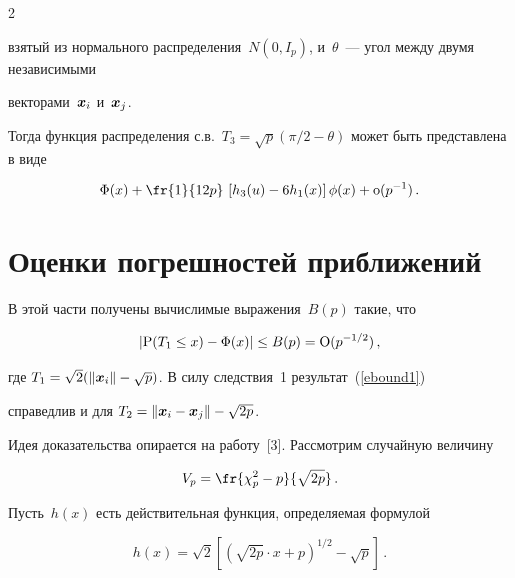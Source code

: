\begin{multicols}{2}
{взятый из нормального распределения~$N(0,I_p)$, и~$\theta$~--- угол между двумя независимыми 

векторами~$\mbox{\boldmath{$x$}}_i$ и~$\mbox{\boldmath{$x$}}_j$.

Тогда функция распределения с.в.\  $T_3 = \sqrt{p}\left(\pi/2 - \theta\right)$ может быть представлена в виде}

\begin{equation*}

\IP(x) +\fr{1}{12p}\,

       \left[h_3(u) - 6h_1(x)\right]\Ip(x) + \o(p^{-1})\,.

\end{equation*}





\section{Оценки погрешностей приближений}



В этой части   получены вычислимые выражения~$B(p)$ такие, что


\begin{equation}

| \P(T_1 \le x) - \IP(x) | \le  B(p) = \O(p^{-1/2})\,,

\label{ebound1}

\end{equation}

где $T_1 = \sqrt 2(\|\mbox{\boldmath{$x$}}_i\| -\sqrt{p})$. В силу следствия~1 результат~(\ref{ebound1}) 

справедлив и для $T_2 =\| \mbox{\boldmath{$x$}}_i - \mbox{\boldmath{$x$}}_j \| -\sqrt{2p}$.



Идея доказательства опирается на работу~[3]. Рассмотрим случайную величину

\begin{equation*}

 V_p = \fr{\chi_p^2 - p}{\sqrt{2p}}\,.

\end{equation*}

Пусть~$h(x)$ есть действительная функция, определяемая формулой

$$

h(x) = \sqrt{2}\left[\left(\sqrt{2p}\cdot x + p \right)^{{1}/{2}} - \sqrt{p}\right]\,.

$$


\end{multicols}
